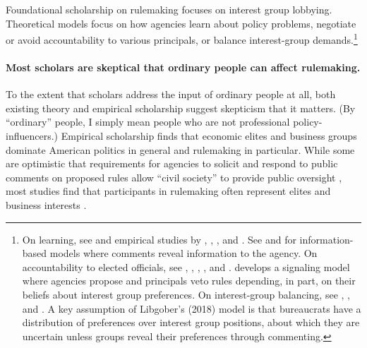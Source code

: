\documentclass[
      12pt,
        ]{article}
\begin{document}
Foundational scholarship on rulemaking \citep[\citet{Furlong1997}, \citet{Furlong1998}, \citet{Kerwin2011}]{Furlong2005} focuses on interest group lobbying. Theoretical models focus on how agencies learn about policy problems, negotiate or avoid accountability to various principals, or balance interest-group demands.\footnote{On learning, see \citet{Kerwin2011} and empirical studies by \citet{Yackee2012},
  \citet{Cook2017}, \citet{Gordon2018}, and \citet{Walters2019}. See \citet{Gailmard2017} and
  \citet{Libgober2018} for information-based models where comments reveal information to the agency.
  On accountability to elected officials, see \citet{Furlong1997}, \citet{Nou2016},
  \citet{Potter2016}, \citet{Woods2018}, and \citet{Yackee2009RegGov}.
  \citet{Potter2014dis} develops a signaling model where agencies propose and principals veto rules depending, in part, on their beliefs about interest group preferences.
  On interest-group balancing, see \citet{Yackee2006JOP}, \citet{Yackee2006JPART},
  and \citet{Kerwin2011}. A key assumption of Libgober's (2018) model is that
  bureaucrats have a distribution of preferences over interest group
  positions, about which they are uncertain unless groups reveal their
  preferences through commenting.}

\hypertarget{most-scholars-are-skeptical-that-ordinary-people-can-affect-rulemaking.}{%
\paragraph{Most scholars are skeptical that ordinary people can affect rulemaking.}\label{most-scholars-are-skeptical-that-ordinary-people-can-affect-rulemaking.}}

To the extent that scholars address the input of ordinary people at all, both
existing theory and empirical scholarship suggest skepticism that it
matters. (By ``ordinary'' people, I simply mean people who are not
professional policy-influencers.)
Empirical scholarship finds that economic elites and business groups
dominate American politics in general \citep[\citet{Soss2007}, Hertel-Fernandez2019, \citet{Hacker2003}, \citet{Gilens2014}]{Jacobs2005} and rulemaking in
particular. While some are optimistic that requirements for agencies to
solicit and respond to public comments on proposed rules allow ``civil
society'' to provide public oversight \citep{Michaels2015, Metzger2010}, most
studies find that participants in rulemaking often represent elites and
business interests \citep{Seifter2016UCLA, Crow2015, Wagner2011, West2009, Yackee2006JOP, Yackee2006JPART, Golden1998, Haeder2015, Cook2017}.
\end{document}
